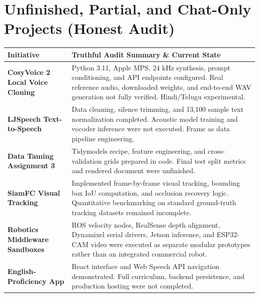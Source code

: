 \documentclass[10pt,a4paper]{article}
\newcommand{\statusprogress}{\tcbox[on line, colback=progressbg, colframe=progress!50!white, size=small, arc=2pt, boxrule=0.5pt]{\scriptsize\bfseries\color{progress}\faIcon{spinner}\ IN PROGRESS}}
\newcommand{\statusprototype}{\tcbox[on line, colback=prototypebg, colframe=prototype!50!white, size=small, arc=2pt, boxrule=0.5pt]{\scriptsize\bfseries\color{prototype}\faIcon{flask}\ PROTOTYPE / PARTIAL}}
\begin{document}
\section{Unfinished, Partial, and Chat-Only Projects (Honest Audit)}

\begin{tcolorbox}[enhanced, colback=white, colframe=cardborder, boxrule=0.5pt, arc=3pt, left=8pt, right=8pt, top=5pt, bottom=5pt]
  \begin{tabularx}{\textwidth}{@{}lX@{}}
    \toprule
    \textbf{Initiative} & \textbf{Truthful Audit Summary \& Current State} \\
    \midrule
    \textbf{CosyVoice 2 Local Voice Cloning} & Python 3.11, Apple MPS, 24 kHz synthesis, prompt conditioning, and API endpoints configured. Real reference audio, downloaded weights, and end-to-end WAV generation not fully verified. Hindi/Telugu experimental. \hfill \statusprototype \\
    \textbf{LJSpeech Text-to-Speech} & Data cleaning, silence trimming, and 13,100 sample text normalization completed. Acoustic model training and vocoder inference were not executed. Frame as data pipeline engineering. \hfill \statusprogress \\
    \textbf{Data Taming Assignment 3} & Tidymodels recipe, feature engineering, and cross-validation grids prepared in code. Final test split metrics and rendered document were unfinished. \hfill \statusprogress \\
    \textbf{SiamFC Visual Tracking} & Implemented frame-by-frame visual tracking, bounding box IoU computation, and occlusion recovery logic. Quantitative benchmarking on standard ground-truth tracking datasets remained incomplete. \hfill \statusprototype \\
    \textbf{Robotics Middleware Sandboxes} & ROS velocity nodes, RealSense depth alignment, Dynamixel serial drivers, Jetson inference, and ESP32-CAM video were executed as separate modular prototypes rather than an integrated commercial robot. \hfill \statusprototype \\
    \textbf{English-Proficiency App} & React interface and Web Speech API navigation demonstrated. Full curriculum, backend persistence, and production hosting were not completed. \hfill \statusprototype \\
    \bottomrule
  \end{tabularx}
\end{tcolorbox}
\end{document}
